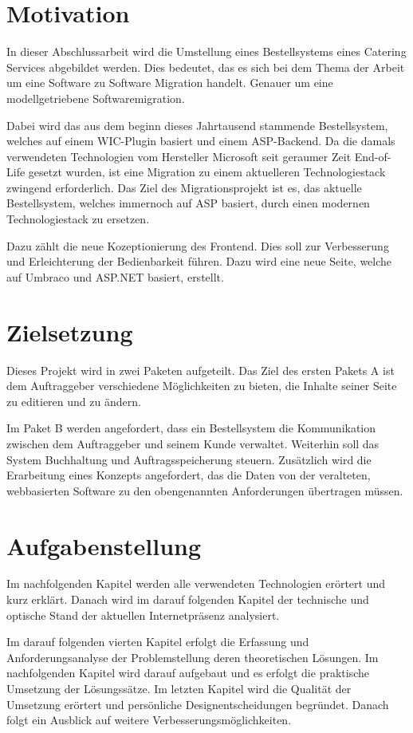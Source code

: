 \section{Motivation}

In dieser Abschlussarbeit wird die Umstellung eines Bestellsystems eines Catering Services abgebildet werden. Dies bedeutet, das es sich bei dem Thema der Arbeit um eine Software zu Software Migration handelt. Genauer um eine modellgetriebene Softwaremigration.

Dabei wird das aus dem beginn dieses Jahrtausend stammende Bestellsystem, welches auf einem \ac{WIC}-Plugin basiert und einem \ac{ASP}-Backend. Da die damals verwendeten Technologien vom Hersteller Microsoft seit geraumer Zeit End-of-Life gesetzt wurden, ist eine Migration zu einem aktuelleren Technologiestack zwingend erforderlich. Das Ziel des Migrationsprojekt ist es, das aktuelle Bestellsystem, welches immernoch auf ASP basiert, durch einen modernen Technologiestack zu ersetzen. 

Dazu zählt die neue Kozeptionierung des Frontend. Dies soll zur Verbesserung und Erleichterung der Bedienbarkeit führen. Dazu wird eine neue Seite, welche auf Umbraco und ASP.NET basiert, erstellt.

\section{Zielsetzung} 

Dieses Projekt wird in zwei Paketen aufgeteilt. Das Ziel des ersten Pakets A ist dem Auftraggeber verschiedene Möglichkeiten zu bieten, die Inhalte seiner Seite zu editieren und zu ändern.

Im Paket B werden angefordert, dass ein Bestellsystem die Kommunikation zwischen dem Auftraggeber und seinem Kunde verwaltet. Weiterhin soll das System Buchhaltung und Auftragsspeicherung steuern. Zusätzlich wird die Erarbeitung eines Konzepts angefordert, das die Daten von der veralteten, webbasierten Software zu den obengenannten Anforderungen übertragen müssen. 

\section{Aufgabenstellung}

Im nachfolgenden Kapitel werden alle verwendeten Technologien erörtert und kurz erklärt. Danach wird im darauf folgenden Kapitel der technische und optische Stand der aktuellen Internetpräsenz analysiert.

 Im darauf folgenden vierten Kapitel erfolgt die Erfassung und Anforderungsanalyse der Problemstellung deren theoretischen Lösungen. Im nachfolgenden Kapitel wird darauf aufgebaut und es erfolgt die praktische Umsetzung der Lösungssätze.
Im letzten Kapitel wird die Qualität der Umsetzung erörtert und persönliche Designentscheidungen begründet.  Danach folgt ein Ausblick auf weitere Verbesserungsmöglichkeiten.

